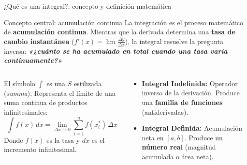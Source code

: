 \documentclass[aspectratio=169,11pt]{beamer}
\begin{document}
\begin{frame}{¿Qué es una integral?: concepto y definición matemática}
\footnotesize
\begin{block}{Concepto central: acumulación continua}
\footnotesize
La integración es el proceso matemático de \textbf{acumulación continua}. Mientras que la derivada determina una \textbf{tasa de cambio instantánea} ($f'(x) = \lim \frac{\Delta y}{\Delta x}$), la integral resuelve la pregunta inversa: \textbf{\textit{«¿cuánto se ha acumulado en total cuando una tasa varía continuamente?»}}
\end{block}
\vspace{0.04cm}
\begin{columns}[T,onlytextwidth]
\begin{techbox}[title=Definición formal (Leibniz), top=3pt,bottom=3pt]
\scriptsize
El símbolo $\int$ es una $S$ estilizada (\textit{summa}). Representa el límite de una suma continua de productos infinitesimales:
\[
\int f(x)\,dx = \lim_{\Delta x \to 0} \sum_{i=1}^n f(x_i^*)\,\Delta x
\]
Donde $f(x)$ es la tasa y $dx$ es el incremento infinitesimal.
\end{techbox}
\begin{keybox}[title=Dualidad del cálculo integral, top=3pt,bottom=3pt]
\scriptsize
\begin{itemize}[itemsep=2pt]
  \item \textbf{Integral Indefinida:} Operador inverso de la derivación. Produce una \textbf{familia de funciones} (antiderivadas).
  \item \textbf{Integral Definida:} Acumulación neta en $[a,b]$. Produce un \textbf{número real} (magnitud acumulada o área neta).
\end{itemize}
\end{keybox}
\end{columns}
\end{frame}
\end{document}
